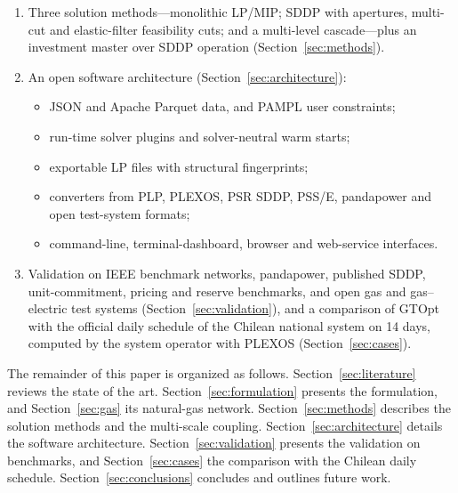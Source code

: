 \begin{enumerate}
  \item Three solution methods---monolithic LP/MIP; SDDP with
    apertures, multi-cut and elastic-filter feasibility cuts; and a
    multi-level cascade---plus an investment master over SDDP operation
    (Section~\ref{sec:methods}).

  \item An open software architecture (Section~\ref{sec:architecture}):
    \begin{itemize}
      \item JSON and Apache Parquet data, and PAMPL user constraints;
      \item run-time solver plugins and solver-neutral warm starts;
      \item exportable LP files with structural fingerprints;
      \item converters from PLP, PLEXOS, PSR SDDP, PSS/E, pandapower
        and open test-system formats;
      \item command-line, terminal-dashboard, browser and web-service
        interfaces.
    \end{itemize}

  \item Validation on IEEE benchmark networks, pandapower, published
    SDDP, unit-commitment, pricing and reserve benchmarks, and open gas
    and gas--electric test systems (Section~\ref{sec:validation}), and
    a comparison of
    GTOpt with the official daily schedule of the Chilean national
    system on 14 days, computed by the system operator with PLEXOS
    (Section~\ref{sec:cases}).
\end{enumerate}

The remainder of this paper is organized as follows.
Section~\ref{sec:literature} reviews the state of the art.
Section~\ref{sec:formulation} presents the formulation, and
Section~\ref{sec:gas} its natural-gas network.
Section~\ref{sec:methods} describes the solution methods and the
multi-scale coupling.  Section~\ref{sec:architecture} details the
software architecture.  Section~\ref{sec:validation} presents the
validation on benchmarks, and Section~\ref{sec:cases} the comparison
with the Chilean daily schedule.  Section~\ref{sec:conclusions}
concludes and outlines future work.
